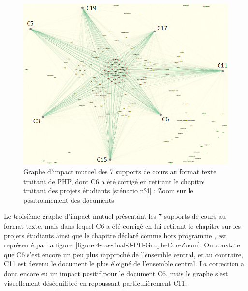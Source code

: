 \vfill
\hspace{0pt}

\begin{figure}[htb!]
\centering
\centerline{  %
\includegraphics[scale=0.75]{4-Experiences/images/cas-final/2-Full-Text-C+noP-PHP_core-courses-written.png}
}
\caption{Graphe d'impact mutuel des 7 supports de cours au format texte traitant de PHP, dont C6 a été corrigé en retirant le chapitre traitant des projets étudiants [scénario n°4] : Zoom sur le positionnement des documents}
\label{figure:4-cas-final-2-PII-GrapheCoreZoom}
\end{figure}

\hspace{0pt}
\vfill

\clearpage

Le troisième graphe d'impact mutuel présentant les 7 supports de cours au format texte, mais dans lequel C6 a été corrigé en lui retirant le chapitre sur les projets étudiants ainsi que le chapitre déclaré comme \og hors programme \fg, est représenté par la figure~\ref{figure:4-cas-final-3-PII-GrapheCoreZoom}.
On constate que C6 s'est encore un peu plus rapproché de l'ensemble central, et au contraire, C11 est devenu le document le plus éloigné de l'ensemble central.
La correction a donc encore eu un impact positif pour le document C6, mais le graphe s'est visuellement déséquilibré en repoussant particulièrement C11.

\vfill
\hspace{0pt}

